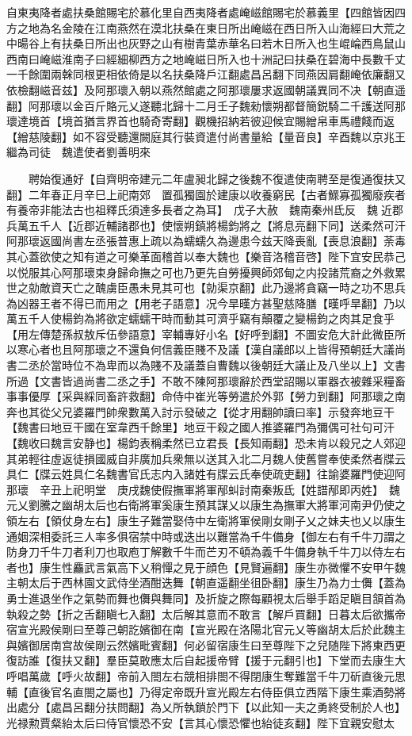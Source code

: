 自東夷降者處扶桑館賜宅於慕化里自西夷降者處崦嵫館賜宅於慕義里【四館皆因四方之地為名金陵在江南燕然在漠北扶桑在東日所出崦嵫在西日所入山海經曰大荒之中暘谷上有扶桑日所出也灰野之山有樹青葉赤華名曰若木日所入也生崐崘西鳥鼠山西南曰崦嵫淮南子曰經細柳西方之地崦嵫日所入也十洲記曰扶桑在碧海中長數千丈一千餘圍兩榦同根更相依倚是以名扶桑降戶江翻處昌呂翻下同燕因肩翻崦依廉翻又依檢翻嵫音兹】及阿那瓌入朝以燕然館處之阿那瓌屢求返國朝議異同不决【朝直遥翻】阿那瓌以金百斤賂元乂遂聽北歸十二月壬子魏勑懷朔都督簡鋭騎二千護送阿那瓌達境首【境首猶言界首也騎奇寄翻】觀機招納若彼迎候宜賜繒帛車馬禮餞而返【繒慈陵翻】如不容受聽還闕庭其行裝資遣付尚書量給【量音良】辛酉魏以京兆王繼為司徒　魏遣使者劉善明來

　　聘始復通好【自齊明帝建元二年盧昶北歸之後魏不復遣使南聘至是復通復扶又翻】二年春正月辛巳上祀南郊　置孤獨園於建康以收養窮民【古者鰥寡孤獨廢疾者有養帝非能法古也祖釋氏須達多長者之為耳】　戊子大赦　魏南秦州氐反　魏近郡兵萬五千人【近郡近輔諸郡也】使懷朔鎮將楊鈞將之【將息亮翻下同】送柔然可汗阿那瓌返國尚書左丞張普惠上疏以為蠕蠕久為邊患今兹天降喪亂【喪息浪翻】荼毒其心蓋欲使之知有道之可樂革面稽首以奉大魏也【樂音洛稽音啓】陛下宜安民恭己以悦服其心阿那瓌束身歸命撫之可也乃更先自勞擾興師郊甸之内投諸荒裔之外救累世之勍敵資天亡之醜虜臣愚未見其可也【勍渠京翻】此乃邊將貪竊一時之功不思兵為凶器王者不得已而用之【用老子語意】况今旱暵方甚聖慈降膳【暵呼旱翻】乃以萬五千人使楊鈞為將欲定蠕蠕干時而動其可濟乎竊有顛覆之變楊鈞之肉其足食乎【用左傳楚孫叔敖斥伍參語意】宰輔專好小名【好呼到翻】不圖安危大計此微臣所以寒心者也且阿那瓌之不還負何信義臣賤不及議【漢自議郎以上皆得預朝廷大議尚書二丞於當時位不為卑而以為賤不及議蓋自曹魏以後朝廷大議止及八坐以上】文書所過【文書皆過尚書二丞之手】不敢不陳阿那瓌辭於西堂詔賜以軍器衣被雜采糧畜事事優厚【采與綵同畜許救翻】命侍中崔光等勞遣於外郭【勞力到翻】阿那瓌之南奔也其從父兄婆羅門帥衆數萬入討示發破之【從才用翻帥讀曰率】示發奔地豆干【魏書曰地豆干國在室韋西千餘里】地豆干殺之國人推婆羅門為彌偶可社句可汗【魏收曰魏言安静也】楊鈞表稱柔然已立君長【長知兩翻】恐未肯以殺兄之人郊迎其弟輕往虛返徒損國威自非廣加兵衆無以送其入北二月魏人使舊嘗奉使柔然者牒云具仁【牒云姓具仁名魏書官氏志内入諸姓有牒云氏奉使疏吏翻】往諭婆羅門使迎阿那瓌　辛丑上祀明堂　庚戌魏使假撫軍將軍邴虯討南秦叛氐【姓譜邴即丙姓】　魏元乂劉騰之幽胡太后也右衛將軍奚康生預其謀乂以康生為撫軍大將軍河南尹仍使之領左右【領仗身左右】康生子難當娶侍中左衛將軍侯剛女剛子乂之妹夫也乂以康生通姻深相委託三人率多俱宿禁中時或迭出以難當為千牛備身【御左右有千牛刀謂之防身刀千牛刀者利刀也取庖丁解數千牛而芒刃不頓為義千牛備身執千牛刀以侍左右者也】康生性麤武言氣高下乂稍憚之見于顔色【見賢遍翻】康生亦微懼不安甲午魏主朝太后于西林園文武侍坐酒酣迭舞【朝直遥翻坐徂卧翻】康生乃為力士儛【蓋為勇士進退坐作之氣勢而舞也儛與舞同】及折旋之際每顧視太后舉手蹈足瞋目頷首為執殺之勢【折之舌翻瞋七入翻】太后解其意而不敢言【解戶買翻】日暮太后欲攜帝宿宣光殿侯剛曰至尊己朝訖嬪御在南【宣光殿在洛陽北官元乂等幽胡太后於此魏主與嬪御居南宫故侯剛云然嬪毗賓翻】何必留宿康生曰至尊陛下之兒随陛下將東西更復訪誰【復扶又翻】羣臣莫敢應太后自起援帝臂【援于元翻引也】下堂而去康生大呼唱萬歲【呼火故翻】帝前入閤左右競相排閤不得閉康生奪難當千牛刀斫直後元思輔【直後官名直閤之屬也】乃得定帝既升宣光殿左右侍臣俱立西階下康生乘酒勢將出處分【處昌呂翻分扶問翻】為乂所執鎖於門下【以此知一夫之勇終受制於人也】光禄勲賈粲紿太后曰侍官懷恐不安【言其心懷恐懼也紿徒亥翻】陛下宜親安慰太